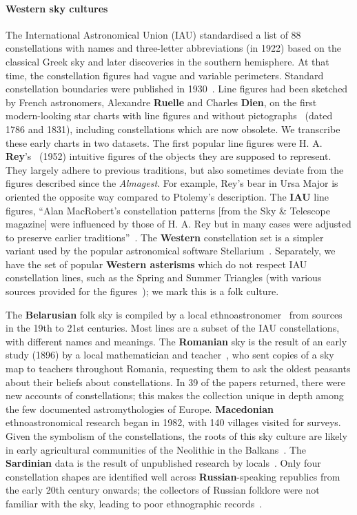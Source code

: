 \documentclass[10pt]{article}
\begin{document}
\paragraph{Western sky cultures} The International Astronomical Union (IAU) standardised a list of 88 constellations with names and three-letter abbreviations (in 1922) based on the classical Greek sky and later discoveries in the southern hemisphere. At that time, the constellation figures had vague and variable perimeters. Standard constellation boundaries were published in 1930~\cite{delporte1930delimitation}. Line figures had been sketched by French astronomers, Alexandre {\bf Ruelle} and Charles {\bf Dien}, on the first modern-looking star charts with line figures and without pictographs~\cite{Ruelle,Dien} (dated 1786 and 1831), including constellations which are now obsolete. We transcribe these early charts in two datasets. The first popular line figures were H. A. {\bf Rey}'s~\cite{rey1952stars} (1952) intuitive figures of the objects they are supposed to represent. They largely adhere to previous traditions, but also sometimes deviate from the figures described since the \textit{Almagest}. For example, Rey's bear in Ursa Major is oriented the opposite way compared to Ptolemy's description. The {\bf IAU} line figures, ``Alan MacRobert's constellation patterns [from the Sky \& Telescope magazine] were influenced by those of H. A. Rey but in many cases were adjusted to preserve earlier traditions''~\cite{IAU}. The {\bf Western} constellation set is a simpler variant used by the popular astronomical software Stellarium~\cite{Stellarium}. Separately, we have the set of popular {\bf Western asterisms} which do not respect IAU constellation lines, such as the Spring and Summer Triangles (with various sources provided for the figures~\cite{Stellarium}); we mark this is a folk culture.

The {\bf Belarusian} folk sky is compiled by a local ethnoastronomer~\cite{avilin2008astronyms} from sources in the 19th to 21st centuries. Most lines are a subset of the IAU constellations, with different names and meanings. The {\bf Romanian} sky is the result of an early study (1896) by a local mathematician and teacher~\cite{otescu1907}, who sent copies of a sky map to teachers throughout Romania, requesting them to ask the oldest peasants about their beliefs about constellations. In 39 of the papers returned, there were new accounts of constellations; this makes the collection unique in depth among the few documented astromythologies of Europe. {\bf Macedonian} ethnoastronomical research began in 1982, with 140 villages visited for surveys. Given the symbolism of the constellations, the roots of this sky culture are likely in early agricultural communities of the Neolithic in the Balkans~\cite{cenev2008macedonian}. The {\bf Sardinian} data is the result of unpublished research by locals~\cite{Stellarium}. Only four constellation shapes are identified well across {\bf Russian}-speaking republics from the early 20th century onwards; the collectors of Russian folklore were not familiar with the sky, leading to poor ethnographic records~\cite{svjatskij2007astronomija}. 
\end{document}
